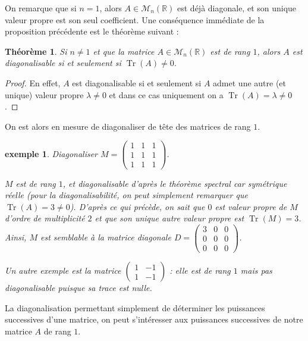 \documentclass[a4paper]{article}
\newtheorem*{theorem}{Théorème}
\newtheorem*{example}{exemple}
\begin{document}
On remarque que si $n=1$, alors $A \in \mathcal{M}_{n}(\mathbb{R})$ est déjà diagonale, et son unique valeur propre est son seul coefficient. Une conséquence immédiate de la proposition précédente est le théorème suivant :

\begin{theorem}
    Si $n \neq 1$ et que la matrice $A \in \mathcal{M}_{n}(\mathbb{R})$ est de rang $1$, alors $A$ est diagonalisable si et seulement si $\operatorname{Tr}(A) \neq 0$.
\end{theorem}

\begin{proof}
    En effet, $A$ est diagonalisable si et seulement si $A$ admet une autre (et unique) valeur propre $\lambda \neq 0$ et dans ce cas uniquement on a $\operatorname{Tr}(A) = \lambda \neq 0$. 
\end{proof}

On est alors en mesure de diagonaliser de tête des matrices de rang $1$.

\begin{example}
    Diagonaliser $M = \begin{pmatrix} 1 & 1 & 1 \\ 1 & 1 & 1 \\ 1 & 1 & 1 \end{pmatrix}$.
    
    $M$ est de rang $1$, et diagonalisable d'après le théorème spectral car symétrique réelle (pour la diagonalisabilité, on peut simplement remarquer que $\operatorname{Tr}(A) = 3 \neq 0$). D'après ce qui précède, on sait que $0$ est valeur propre de $M$ d'ordre de multiplicité $2$ et que son unique autre valeur propre est $\operatorname{Tr}(M) = 3$. Ainsi, $M$ est semblable à la matrice diagonale $D = \begin{pmatrix} 3 & 0 & 0 \\ 0 & 0 & 0 \\ 0 & 0 & 0 \end{pmatrix}$.
    
    Un autre exemple est la matrice $\begin{pmatrix}1 & -1 \\ 1 & -1\end{pmatrix}$ : elle est de rang $1$ mais pas diagonalisable puisque sa trace est nulle.
\end{example}

La diagonalisation permettant simplement de déterminer les puissances successives d'une matrice, on peut s'intéresser aux puissances successives de notre matrice $A$ de rang $1$.
\end{document}
